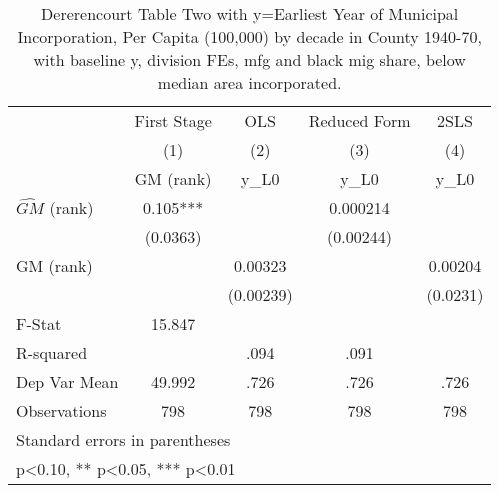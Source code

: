 \begin{table}[htbp]\centering
\def\sym#1{\ifmmode^{#1}\else\(^{#1}\)\fi}
\caption{Dererencourt Table Two with y=Earliest Year of Municipal Incorporation, Per Capita (100,000) by decade in County 1940-70, with baseline y, division FEs, mfg and black mig share, below median area incorporated.}
\begin{tabular}{l*{4}{c}}
\toprule
                    & First Stage   &         OLS   &Reduced Form   &        2SLS   \\
                    &\multicolumn{1}{c}{(1)}&\multicolumn{1}{c}{(2)}&\multicolumn{1}{c}{(3)}&\multicolumn{1}{c}{(4)}\\
                    &\multicolumn{1}{c}{GM  (rank)}&\multicolumn{1}{c}{y\_L0}&\multicolumn{1}{c}{y\_L0}&\multicolumn{1}{c}{y\_L0}\\
\midrule
$\hat{GM}$ (rank)   &       0.105***&               &    0.000214   &               \\
                    &    (0.0363)   &               &   (0.00244)   &               \\
\addlinespace
GM  (rank)          &               &     0.00323   &               &     0.00204   \\
                    &               &   (0.00239)   &               &    (0.0231)   \\
\midrule
F-Stat              &      15.847   &               &               &               \\
R-squared           &               &        .094   &        .091   &               \\
Dep Var Mean        &      49.992   &        .726   &        .726   &        .726   \\
Observations        &         798   &         798   &         798   &         798   \\
\bottomrule
\multicolumn{5}{l}{\footnotesize Standard errors in parentheses}\\
\multicolumn{5}{l}{\footnotesize * p<0.10, ** p<0.05, *** p<0.01}\\
\end{tabular}
\end{table}
